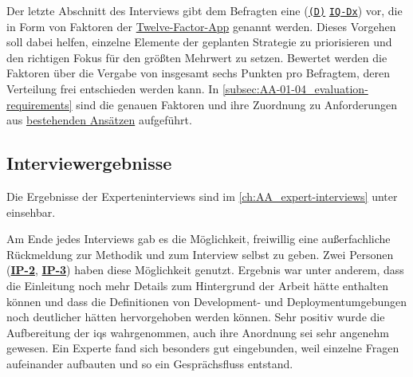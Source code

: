 Der letzte Abschnitt des Interviews gibt dem Befragten eine \textbf{} (\texttt{\hyperref[subsubsec:04-01-02-02_form]{(D)}} \textrightarrow \texttt{\hyperref[subsec:AA-01-04_evaluation-requirements]{IQ-Dx}}) vor, die in Form von Faktoren der \hyperref[sec:03-05_concept-of-twelve-factor-app]{Twelve-Factor-App} genannt werden. Dieses Vorgehen soll dabei helfen, einzelne Elemente der geplanten  Strategie zu priorisieren und den richtigen Fokus für den größten Mehrwert zu setzen. Bewertet werden die Faktoren über die Vergabe von insgesamt sechs Punkten pro Befragtem, deren Verteilung frei entschieden werden kann. In \autoref{subsec:AA-01-04_evaluation-requirements} sind die genauen Faktoren und ihre Zuordnung zu Anforderungen aus \hyperref[ch:03_examination-of-existing-approaches]{bestehenden Ansätzen} aufgeführt.

\subsection{Interviewergebnisse}
\label{subsec:04-01-04_interview-results}

Die Ergebnisse der Experteninterviews sind im \autoref{ch:AA_expert-interviews} unter  einsehbar.

Am Ende jedes Interviews gab es die Möglichkeit, freiwillig eine außerfachliche Rückmeldung zur Methodik und zum Interview selbst zu geben. Zwei Personen (\textbf{\hyperref[sec:AA-02_interview-persons]{IP-2}}, \textbf{\hyperref[sec:AA-02_interview-persons]{IP-3}}) haben diese Möglichkeit genutzt. Ergebnis war unter anderem, dass die Einleitung noch mehr Details zum Hintergrund der Arbeit hätte enthalten können und dass die Definitionen von Development- und Deploymentumgebungen noch deutlicher hätten hervorgehoben werden können. Sehr positiv wurde die Aufbereitung der \Glspl{iq} wahrgenommen, auch ihre Anordnung sei sehr angenehm gewesen. Ein Experte fand sich besonders gut eingebunden, weil einzelne Fragen aufeinander aufbauten und so ein Gesprächsfluss entstand.

